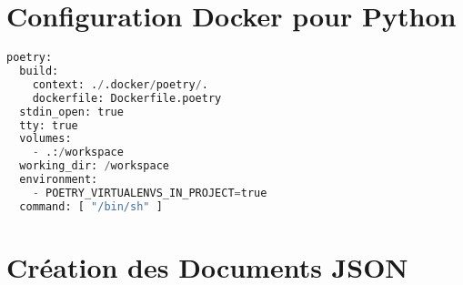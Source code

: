 \section{Configuration Docker pour Python}
\label{ann:docker_poetry}
\begin{lstlisting}[language=Python, caption=Fichier de configuration Docker pour Python, label=lst:docker_poetry]
poetry:
  build:
    context: ./.docker/poetry/.
    dockerfile: Dockerfile.poetry
  stdin_open: true
  tty: true
  volumes:
    - .:/workspace
  working_dir: /workspace
  environment:
    - POETRY_VIRTUALENVS_IN_PROJECT=true
  command: [ "/bin/sh" ]
\end{lstlisting}

\section{Création des Documents JSON}
